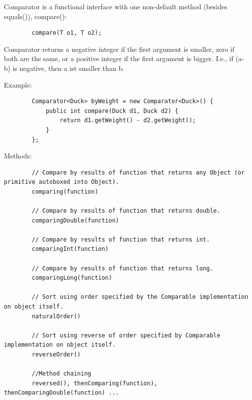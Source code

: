 \documentclass{scrartcl}
\begin{document}
    Comparator is a functional interface with one non-default method (besides equals()), compare():

    \begin{lstlisting}
        compare(T o1, T o2);
    \end{lstlisting}

    Comparator returns a negative integer if the first argument is smaller, zero if both are the same, or a positive integer if the first argument is bigger. I.e., if (a-b) is negative, then a ist smaller than b.

    Example:
    \begin{lstlisting}
        Comparator<Duck> byWeight = new Comparator<Duck>() {
            public int compare(Duck d1, Duck d2) {
                return d1.getWeight() - d2.getWeight();
            }
        };
    \end{lstlisting}

    Methods:

    \begin{lstlisting}
        // Compare by results of function that returns any Object (or primitive autoboxed into Object).
        comparing(function)

        // Compare by results of function that returns double.
        comparingDouble(function)

        // Compare by results of function that returns int.
        comparingInt(function)

        // Compare by results of function that returns long.
        comparingLong(function)

        // Sort using order specified by the Comparable implementation on object itself.
        naturalOrder()

        // Sort using reverse of order specified by Comparable implementation on object itself.
        reverseOrder()

        //Method chaining
        reversed(), thenComparing(function), thenComparingDouble(function) ...

    \end{lstlisting}

    \begin{lstlisting}
    \end{lstlisting}


    \begin{lstlisting}
    \end{lstlisting}


    \begin{lstlisting}
    \end{lstlisting}
\end{document}
